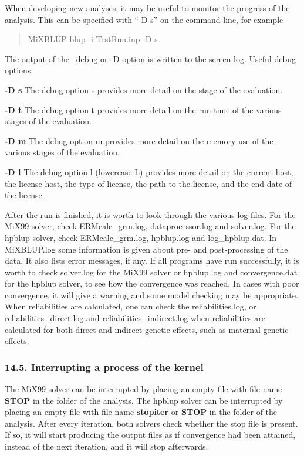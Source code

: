 When developing new analyses, it may be useful to monitor the progress
of the analysis. This can be specified with ``-D s'' on the command
line, for example

\begin{quote}
MiXBLUP blup -i TestRun.inp -D s
\end{quote}

The output of the --debug or -D option is written to the screen log.
Useful debug options:

\textbf{-D s} The debug option s provides more detail on the stage of
the evaluation.

\textbf{-D t} The debug option t provides more detail on the run time of
the various stages of the evaluation.

\textbf{-D m} The debug option m provides more detail on the memory use
of the various stages of the evaluation.

\textbf{-D l} The debug option l (lowercase L) provides more detail on
the current host, the license host, the type of license, the path to the
license, and the end date of the license.

After the run is finished, it is worth to look through the various
log-files. For the MiX99 solver, check ERMcalc\_grm.log,
dataprocessor.log and solver.log. For the hpblup solver, check
ERMcalc\_grm.log, hpblup.log and log\_hpblup.dat. In MiXBLUP.log some
information is given about pre- and post-processing of the data. It also
lists error messages, if any. If all programs have run successfully, it
is worth to check solver.log for the MiX99 solver or hpblup.log and
convergence.dat for the hpblup solver, to see how the convergence was
reached. In cases with poor convergence, it will give a warning and some
model checking may be appropriate. When reliabilities are calculated,
one can check the reliabilities.log, or reliabilities\_direct.log and
reliabilities\_indirect.log when reliabilities are calculated for both
direct and indirect genetic effects, such as maternal genetic effects.

\subsubsection{14.5. Interrupting a process of the kernel}\label{Runn06}

The MiX99 solver can be interrupted by placing an empty file with file
name \textbf{STOP} in the folder of the analysis. The hpblup solver can
be interrupted by placing an empty file with file name \textbf{stopiter}
or \textbf{STOP} in the folder of the analysis. After every iteration,
both solvers check whether the stop file is present. If so, it will
start producing the output files as if convergence had been attained,
instead of the next iteration, and it will stop afterwards.

